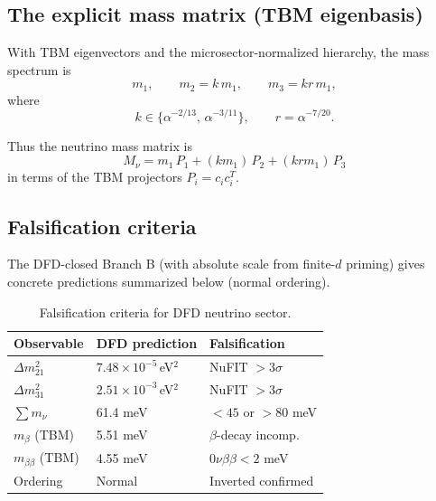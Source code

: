 \subsection{The explicit mass matrix (TBM eigenbasis)}\label{app:nu-matrix}

With TBM eigenvectors and the microsector-normalized hierarchy, the mass spectrum
is
\begin{equation}
m_1,\qquad m_2 = k\,m_1,\qquad m_3 = k r\,m_1,
\end{equation}
where
\begin{equation}
k\in\{\alpha^{-2/13},\,\alpha^{-3/11}\},\qquad r=\alpha^{-7/20}.
\end{equation}

Thus the neutrino mass matrix is
\begin{equation}
\boxed{
M_\nu = m_1\,P_1 + (k m_1)\,P_2 + (k r m_1)\,P_3
}
\end{equation}
in terms of the TBM projectors $P_i=c_i c_i^T$.

\subsection{Falsification criteria}\label{app:nu-falsify}

The DFD-closed Branch B (with absolute scale from finite-$d$ priming) gives
concrete predictions summarized below (normal ordering).

\begin{table}[h]
\centering
\caption{Falsification criteria for DFD neutrino sector.}\label{tab:nu-falsify}
\scriptsize
\setlength{\tabcolsep}{2pt}
\begin{tabular}{lll}
\toprule
Observable & DFD prediction & Falsification \\
\midrule
$\Delta m^2_{21}$ & $7.48\!\times\!10^{-5}$\,eV$^2$ & NuFIT $>3\sigma$ \\
$\Delta m^2_{31}$ & $2.51\!\times\!10^{-3}$\,eV$^2$ & NuFIT $>3\sigma$ \\
$\sum m_\nu$ & 61.4 meV & $<45$ or $>80$ meV \\
$m_{\beta}$ (TBM) & 5.51 meV & $\beta$-decay incomp. \\
$m_{\beta\beta}$ (TBM) & 4.55 meV & $0\nu\beta\beta < 2$ meV \\
Ordering & Normal & Inverted confirmed \\
\bottomrule
\end{tabular}
\end{table}

